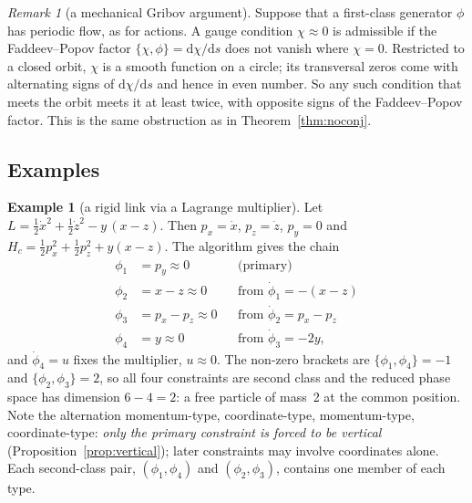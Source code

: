 \documentclass[11pt,a4paper]{article}
\theoremstyle{definition}
\newtheorem{example}[theorem]{Example}
\theoremstyle{remark}
\newtheorem{remark}[theorem]{Remark}
\newcommand{\dd}{\mathrm{d}}
\newcommand{\PB}[2]{\{#1,#2\}}
\newcommand{\weq}{\approx}
\begin{document}
\begin{remark}[a mechanical Gribov argument]
Suppose that a first-class generator $\phi$ has periodic flow, as for actions. A gauge condition $\chi\weq0$ is admissible if the Faddeev--Popov factor $\PB\chi\phi=\dd\chi/\dd s$ does not vanish where $\chi=0$. Restricted to a closed orbit, $\chi$ is a smooth function on a circle; its transversal zeros come with alternating signs of $\dd\chi/\dd s$ and hence in even number. So any such condition that meets the orbit meets it at least twice, with opposite signs of the Faddeev--Popov factor. This is the same obstruction as in Theorem~\ref{thm:noconj}.
\end{remark}

\subsection{Examples}

\begin{example}[a rigid link via a Lagrange multiplier]\label{ex:link}
Let $L=\tfrac12\dot x^2+\tfrac12\dot z^2-y\,(x-z)$. Then $p_x=\dot x$, $p_z=\dot z$, $p_y=0$ and $H_c=\tfrac12p_x^2+\tfrac12p_z^2+y(x-z)$. The algorithm gives the chain
\begin{align*}
\phi_1&=p_y\weq0 &&\text{(primary)}\\
\phi_2&=x-z\weq0 &&\text{from }\dot\phi_1=-(x-z)\\
\phi_3&=p_x-p_z\weq0 &&\text{from }\dot\phi_2=p_x-p_z\\
\phi_4&=y\weq0 &&\text{from }\dot\phi_3=-2y ,
\end{align*}
and $\dot\phi_4=u$ fixes the multiplier, $u\weq0$. The non-zero brackets are $\PB{\phi_1}{\phi_4}=-1$ and $\PB{\phi_2}{\phi_3}=2$, so all four constraints are second class and the reduced phase space has dimension $6-4=2$: a free particle of mass~2 at the common position. Note the alternation momentum-type, coordinate-type, momentum-type, coordinate-type: \emph{only the primary constraint is forced to be vertical} (Proposition~\ref{prop:vertical}); later constraints may involve coordinates alone. Each second-class pair, $(\phi_1,\phi_4)$ and $(\phi_2,\phi_3)$, contains one member of each type.
\end{example}
\end{document}
